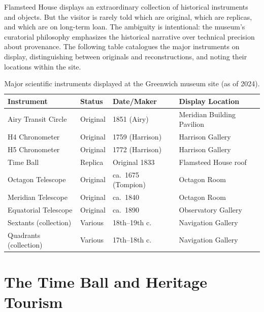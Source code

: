 Flamsteed House displays an extraordinary collection of historical instruments and objects. But the visitor is rarely told which are original, which are replicas, and which are on long-term loan. The ambiguity is intentional: the museum's curatorial philosophy emphasizes the historical narrative over technical precision about provenance. The following table catalogues the major instruments on display, distinguishing between originals and reconstructions, and noting their locations within the site.

\begin{table}[!ht]
  \centering
  \caption{Major scientific instruments displayed at the Greenwich museum site (as of 2024).}
  \label{tab:greenwich-instruments}
  \small
  \begin{tabularx}{\linewidth}{lllX}
    \toprule
    \textbf{Instrument} & \textbf{Status} & \textbf{Date/Maker} & \textbf{Display Location} \\
    \midrule
    Airy Transit Circle & Original & 1851 (Airy) & Meridian Building Pavilion \\
    H4 Chronometer & Original & 1759 (Harrison) & Harrison Gallery \\
    H5 Chronometer & Original & 1772 (Harrison) & Harrison Gallery \\
    Time Ball & Replica & Original 1833 & Flamsteed House roof \\
    Octagon Telescope & Original & ca.~1675 (Tompion) & Octagon Room \\
    Meridian Telescope & Original & ca.~1840 & Octagon Room \\
    Equatorial Telescope & Original & ca.~1890 & Observatory Gallery \\
    Sextants (collection) & Various & 18th--19th c.\ & Navigation Gallery \\
    Quadrants (collection) & Various & 17th--18th c.\ & Navigation Gallery \\
    \bottomrule
  \end{tabularx}
\end{table}

\section{The Time Ball and Heritage Tourism}

